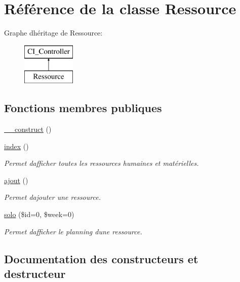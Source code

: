 \hypertarget{class_ressource}{}\section{Référence de la classe Ressource}
\label{class_ressource}
Graphe d\textquotesingle{}héritage de Ressource\+:\begin{figure}[H]
\begin{center}
\leavevmode
\includegraphics[height=2.000000cm]{class_ressource}
\end{center}
\end{figure}
\subsection*{Fonctions membres publiques}
\begin{DoxyCompactItemize}
\item 
\hyperlink{class_ressource_a01759336cb6170021bd11aa531973e95}{\+\_\+\+\_\+construct} ()
\item 
\hyperlink{class_ressource_a4951ac26fe2cd5bd2e943145f11243c8}{index} ()
\begin{DoxyCompactList}\small\item\em Permet d\textquotesingle{}afficher toutes les ressources humaines et matérielles. \end{DoxyCompactList}\item 
\hyperlink{class_ressource_a39214a947c930104701f0589f896c2e4}{ajout} ()
\begin{DoxyCompactList}\small\item\em Permet d\textquotesingle{}ajouter une ressource. \end{DoxyCompactList}\item 
\hyperlink{class_ressource_a99f3c4dbb84bda87a8d2ab092600437a}{solo} (\$id=0, \$week=0)
\begin{DoxyCompactList}\small\item\em Permet d\textquotesingle{}afficher le planning d\textquotesingle{}une ressource. \end{DoxyCompactList}\end{DoxyCompactItemize}


\subsection{Documentation des constructeurs et destructeur}
\mbox{\label{class_ressource_a01759336cb6170021bd11aa531973e95}} 
